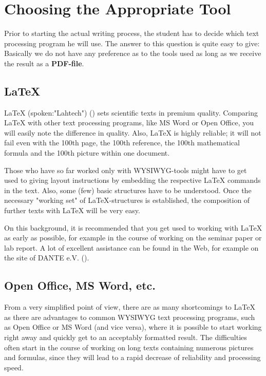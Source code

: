 \chapter{Choosing the Appropriate Tool}

Prior to starting the actual writing process, the student has to decide which text
processing program he will use. The answer to this question is quite easy to give:
Basically we do not have any preference as to the tools used as long as we receive
the result as a \textbf{PDF-file}.


\section{LaTeX}

LaTeX (spoken:"Lahtech") (\cite{latex_book,latex}) sets scientific texts
in premium quality. Comparing LaTeX with other text processing programs, like MS Word
or Open Office, you will easily note the difference in quality. Also, LaTeX is highly
reliable; it will not fail even with the 100th page, the 100th reference, the 100th
mathematical formula and the 100th picture within one document.

Those who have so far worked only with WYSIWYG-tools might have to get used to
giving layout instructions by embedding the respective LaTeX commands in the text.
Also, some (few) basic structures have to be understood. Once the necessary
"working set" of LaTeX-structures is established, the composition of
further texts with LaTeX will be very easy.

On this background, it is recommended that you get used to working with LaTeX as early
as possible, for example in the course of working on the seminar paper or lab report.
A lot of excellent assistance can be found in the Web, for example on the site of
DANTE e.V. (\cite{dante}).


\section{Open Office, MS Word, etc.}

From a very simplified point of view, there are as many shortcomings to LaTeX as there
are advantages to common WYSIWYG text processing programs, such as Open Office or MS Word
(and vice versa), where it is possible to start working right away and quickly get to
an acceptably formatted result. The difficulties often start in the course of working
on long texts containing numerous pictures and formulas, since they will lead to a rapid
decrease of reliability and processing speed.


